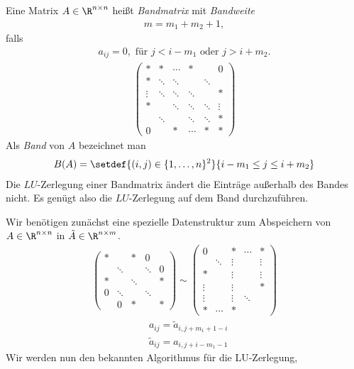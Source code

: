 \begin{defn}
\label{defn:2.7}
Eine Matrix $A\in\R^{n\times n}$ heißt \emph{Bandmatrix} mit
\emph{Bandweite}
\begin{align*}
m=m_1+m_2+1,
\end{align*}
falls
\begin{align*}
a_{ij} = 0, \text{ für } j<i-m_1 \text{ oder }j>i+m_2.
\end{align*}
\begin{align*}
\begin{pmatrix}
* & * & \cdots & * & & 0 \\
* & \ddots & \ddots &  &\ddots \\
\vdots & \ddots& \ddots & \ddots & & *\\
* &  & \ddots & \ddots &  \ddots & \vdots \\ 
 & \ddots & & \ddots &  \ddots & * \\
 0 &  & * & \cdots & * & *
\end{pmatrix}
\end{align*}
Als \emph{Band} von $A$ bezeichnet man
\begin{align*}
B(A) = \setdef{(i,j)\in\{1,\ldots,n\}^2}{i-m_1\le j\le i+m_2}
\end{align*}
Die $LU$-Zerlegung einer Bandmatrix ändert die Einträge außerhalb des Bandes
nicht. Es genügt also die $LU$-Zerlegung auf dem Band durchzuführen.\fishhere
\end{defn}

Wir benötigen zunächst eine spezielle Datenstruktur zum Abspeichern von
$A\in\R^{n\times n}$ in $\tilde{A}\in\R^{n\times m}$.
\begin{align*}
\begin{pmatrix}
* & & * & 0\\
  & \ddots &   	 & \ddots & 0 \\
* & & \ddots &   	  & * \\
0 & \ddots &  & \ddots & \\
  & 0 & * & & * 
\end{pmatrix}
\sim
\begin{pmatrix}
0 & & * & \cdots & *\\
 & \ddots & \vdots & & \vdots \\
* & & \vdots & & \vdots\\
\vdots & & \vdots & & *\\
\vdots & & \vdots & \ddots \\
* & \cdots & *
\end{pmatrix}
\end{align*}
\begin{align*}
&a_{ij} = \tilde{a}_{i,j + m_1 + 1-i}\\
&\tilde{a}_{ij} = a_{i,j+i-m_1-1}
\end{align*}
Wir werden nun den bekannten Algorithmus für die LU-Zerlegung,

